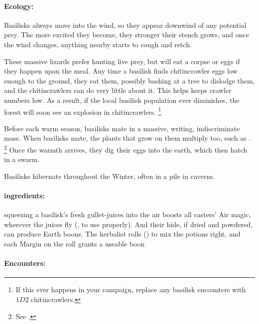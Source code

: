 \begin{multicols}{2}
\paragraph{Ecology:}
Basilisks always move into the wind, so they appear downwind of any potential prey.
The more excited they become, they stronger their stench grows, and once the wind changes, anything nearby starts to cough and retch.

These massive lizards prefer hunting live prey, but will eat a corpse or eggs if they happen upon the meal.
Any time a basilisk finds chitincrawler eggs low enough to the ground, they eat them, possibly bashing at a tree to dislodge them, and the chitincrawlers can do very little about it.
This helps keeps crawler numbers low.
As a result, if the local basilisk population ever diminishes, the forest will soon see an explosion in chitincrawlers.%
\footnote{If this ever happens in your campaign, replace any basilisk encounters with $1D2$ chitincrawlers.}

Before each warm season, basilisks mate in a massive, writing, indiscriminate mass.
When basilisks mate, the plants that grow on them multiply too, such as .%
\footnote{See .}
Once the warmth arrives, they dig their eggs into the earth, which then hatch in a swarm.

\basiliskSwarm

\noindent
Basilisks hibernate throughout the Winter, often in a pile in caverns.

\paragraph{\Glspl{ingredient}:}
squeezing a basilisk's fresh gullet-juices into the air boosts all casters' Air magic, wherever the juices fly (, \tn[10] to use properly).
And their hide, if dried and powdered, can produce Earth \glspl{boon}.
The herbalist rolls  (\tn[10]) to mix the potions right, and each Margin on the roll grants a useable \gls{boon}

\paragraph{Encounters:}


\end{multicols}
